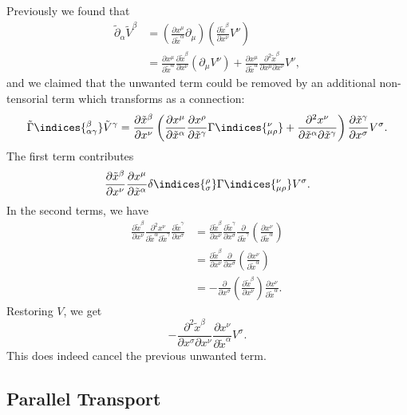 \documentclass[12pt]{article}
\begin{document}
Previously we found that
\begin{align*}
	\tilde \partial_\alpha \tilde V^\beta &= \left( \frac{\partial x^\mu}{\partial \tilde x^\alpha} \partial_\mu\right) \left( \frac{\partial \tilde x^\beta}{\partial x^\nu} V^\nu \right) \\
					      &= \frac{\partial x^\mu}{\partial \tilde x^\alpha} \frac{\partial \tilde x^\beta}{\partial x^\nu} (\partial_\mu V^\nu) + \frac{\partial x^\mu}{\partial \tilde x^\alpha} \frac{\partial^2 \tilde x^\beta}{\partial x^\mu \partial x^\nu} V^\nu,
\end{align*}
and we claimed that the unwanted term could be removed by an additional non-tensorial term which transforms as a connection:
\[
	\tilde \Gamma\indices{^\beta_{\alpha\gamma}} \tilde V^\gamma = \frac{\partial \tilde x^\beta}{\partial x^\nu} \left( \frac{\partial x^\mu}{\partial \tilde x^\alpha} \frac{\partial x^\rho}{\partial \tilde x^\gamma} \Gamma\indices{^\nu_{\mu\rho}} + \frac{\partial^2 x^\nu}{\partial \tilde x^\alpha \partial \tilde x^\gamma} \right) \frac{\partial \tilde x^\gamma}{\partial x^\sigma} V^\sigma.
\]
The first term contributes
\[
	\frac{\partial \tilde x^\beta}{\partial x^\nu} \frac{\partial x^\mu}{\partial \tilde x^\alpha} \delta\indices{^\rho_\sigma} \Gamma\indices{^\nu_{\mu\rho}}V^\sigma.
\]
In the second terms, we have
\begin{align*}
	\frac{\partial \tilde x^\beta}{\partial x^\nu} \frac{\partial^2 x^\nu}{\partial \tilde x^\alpha \partial \tilde x^\gamma} \frac{\partial \tilde x^\gamma}{\partial x^\sigma} &= \frac{\partial \tilde x^\beta}{\partial x^\nu} \frac{\partial \tilde x^\gamma}{\partial x^\sigma} \frac{\partial}{\partial \tilde x^\gamma} \left( \frac{\partial x^\nu}{\partial \tilde x^\alpha} \right) \\
																						     &= \frac{\partial \tilde x^\beta}{\partial x^\nu} \frac{\partial}{\partial x^\sigma} \left( \frac{\partial x^\nu}{\partial \tilde x^\alpha} \right) \\
																						     &= - \frac{\partial}{\partial x^\sigma} \left( \frac{\partial \tilde x^\beta}{\partial x^\nu} \right) \frac{\partial x^\nu}{\partial \tilde x^\alpha}.
\end{align*}
Restoring $V$, we get
\[
- \frac{\partial^2 \tilde x^\beta}{\partial x^\sigma \partial x^\nu} \frac{\partial x^\nu}{\partial \tilde x^\alpha} V^\sigma.
\]
This does indeed cancel the previous unwanted term.

\subsection{Parallel Transport}
\label{sub:par_tr}
\end{document}
